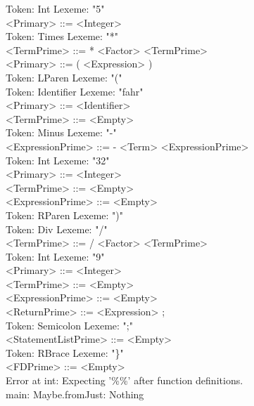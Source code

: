 \documentclass[11pt]{article}
\begin{document}
Token: Int       Lexeme: "5" \\
        <Primary> ::= <Integer> \\
Token: Times     Lexeme: "*" \\
        <TermPrime> ::= * <Factor> <TermPrime> \\
        <Primary> ::= ( <Expression> ) \\
Token: LParen    Lexeme: "(" \\
Token: Identifier        Lexeme: "fahr" \\
        <Primary> ::= <Identifier> \\
        <TermPrime> ::= <Empty> \\
Token: Minus     Lexeme: "-" \\
        <ExpressionPrime> ::= - <Term> <ExpressionPrime> \\
Token: Int       Lexeme: "32" \\
        <Primary> ::= <Integer> \\
        <TermPrime> ::= <Empty> \\
        <ExpressionPrime> ::= <Empty> \\
Token: RParen    Lexeme: ")" \\
Token: Div       Lexeme: "/" \\
        <TermPrime> ::= / <Factor> <TermPrime> \\
Token: Int       Lexeme: "9" \\
        <Primary> ::= <Integer> \\
        <TermPrime> ::= <Empty> \\
        <ExpressionPrime> ::= <Empty> \\
        <ReturnPrime> ::= <Expression> ; \\
Token: Semicolon         Lexeme: ";" \\
        <StatementListPrime> ::= <Empty> \\
Token: RBrace    Lexeme: "\}" \\
        <FDPrime> ::= <Empty> \\
[line 9] Error at int: Expecting '\%\%' after function definitions. \\
main: Maybe.fromJust: Nothing \\
\end{document}
